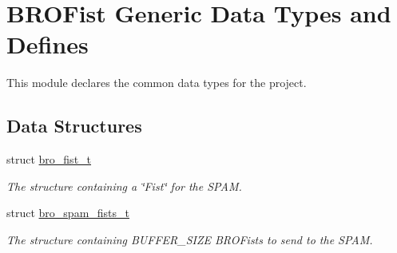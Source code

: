 \hypertarget{group___bro_fist}{
\section{BROFist Generic Data Types and Defines}
\label{group___bro_fist}
}


This module declares the common data types for the project.  


\subsection*{Data Structures}
\begin{DoxyCompactItemize}
\item 
struct \hyperlink{structbro__fist__t}{bro\_\-fist\_\-t}
\begin{DoxyCompactList}\small\item\em The structure containing a \char`\"{}Fist\char`\"{} for the SPAM. \item\end{DoxyCompactList}\item 
struct \hyperlink{structbro__spam__fists__t}{bro\_\-spam\_\-fists\_\-t}
\begin{DoxyCompactList}\small\item\em The structure containing BUFFER\_\-SIZE BROFists to send to the SPAM. \item\end{DoxyCompactList}\end{DoxyCompactItemize}
